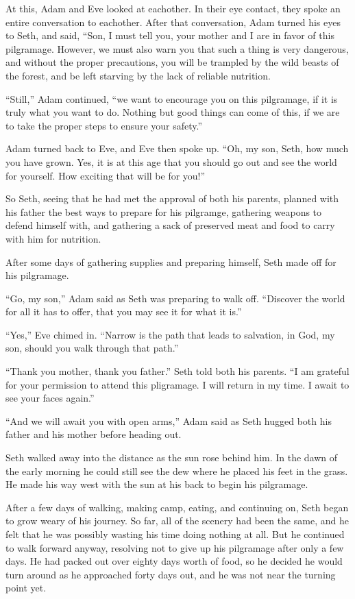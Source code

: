 \documentclass[12pt,twoside,titlepage]{report}
\begin{document}
At this, Adam and Eve looked at eachother. In their eye contact, they
spoke an entire conversation to eachother. After that conversation, Adam
turned his eyes to Seth, and said, ``Son, I must tell you, your mother
and I are in favor of this pilgramage. However, we must also warn you
that such a thing is very dangerous, and without the proper precautions,
you will be trampled by the wild beasts of the forest, and be left
starving by the lack of reliable nutrition.

``Still,'' Adam continued, ``we want to encourage you on this
pilgramage, if it is truly what you want to do. Nothing but good things
can come of this, if we are to take the proper steps to ensure your
safety.''

Adam turned back to Eve, and Eve then spoke up. ``Oh, my son, Seth, how
much you have grown. Yes, it is at this age that you should go out and
see the world for yourself. How exciting that will be for you!''

So Seth, seeing that he had met the approval of both his parents,
planned with his father the best ways to prepare for his pilgramge,
gathering weapons to defend himself with, and gathering a sack of
preserved meat and food to carry with him for nutrition.

After some days of gathering supplies and preparing himself, Seth made
off for his pilgramage.

``Go, my son,'' Adam said as Seth was preparing to walk off. ``Discover
the world for all it has to offer, that you may see it for what it is.''

``Yes,'' Eve chimed in. ``Narrow is the path that leads to salvation, in
God, my son, should you walk through that path.''

``Thank you mother, thank you father.'' Seth told both his parents. ``I
am grateful for your permission to attend this pligramage. I will return
in my time. I await to see your faces again.''

``And we will await you with open arms,'' Adam said as Seth hugged both
his father and his mother before heading out.

Seth walked away into the distance as the sun rose behind him. In the
dawn of the early morning he could still see the dew where he placed his
feet in the grass. He made his way west with the sun at his back to
begin his pilgramage.

After a few days of walking, making camp, eating, and continuing on,
Seth began to grow weary of his journey. So far, all of the scenery had
been the same, and he felt that he was possibly wasting his time doing
nothing at all. But he continued to walk forward anyway, resolving not
to give up his pilgramage after only a few days. He had packed out over
eighty days worth of food, so he decided he would turn around as he
approached forty days out, and he was not near the turning point yet.
\end{document}
